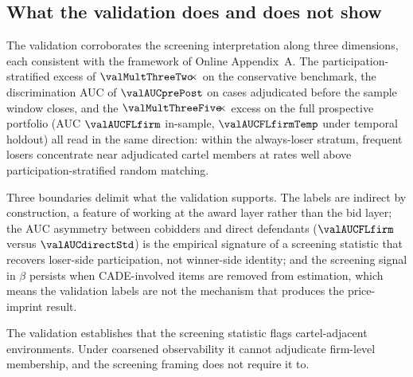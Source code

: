 \subsection{What the validation does and does not show}
\label{sec:cade_scope}

The validation corroborates the screening interpretation along
three dimensions, each consistent with the framework of
Online Appendix~A. The participation-stratified excess of
$\valMultThreeTwo\!\!\times$ on the conservative benchmark, the
discrimination AUC of $\valAUCprePost$ on cases adjudicated
before the sample window closes, and the
$\valMultThreeFive\!\!\times$ excess on the full prospective
portfolio (AUC $\valAUCFLfirm$ in-sample, $\valAUCFLfirmTemp$
under temporal holdout) all read in the same direction:
within the always-loser stratum, frequent losers concentrate
near adjudicated cartel members at rates well above
participation-stratified random matching.

Three boundaries delimit what the validation supports. The
labels are indirect by construction, a feature of working at
the award layer rather than the bid layer; the AUC asymmetry
between cobidders and direct defendants
($\valAUCFLfirm$ versus $\valAUCdirectStd$) is the empirical
signature of a screening statistic that recovers loser-side
participation, not winner-side identity; and the screening
signal in $\beta$ persists when CADE-involved items are removed
from estimation, which means the validation labels are not the
mechanism that produces the price-imprint result.

The validation establishes that the screening statistic flags
cartel-adjacent environments. Under coarsened observability it
cannot adjudicate firm-level membership, and the screening
framing does not require it to.
